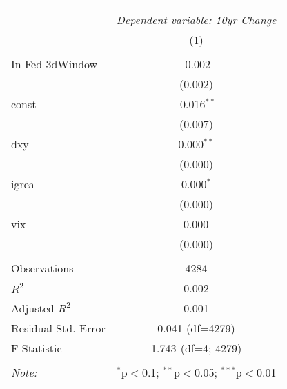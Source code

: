 \begin{table}[!htbp] \centering
\begin{tabular}{@{\extracolsep{5pt}}lc}
\\[-1.8ex]\hline
\hline \\[-1.8ex]
& \multicolumn{1}{c}{\textit{Dependent variable: 10yr Change}} \
\cr \cline{2-2}
\\[-1.8ex] & (1) \\
\hline \\[-1.8ex]
 In Fed 3dWindow & -0.002$^{}$ \\
& (0.002) \\
 const & -0.016$^{**}$ \\
& (0.007) \\
 dxy & 0.000$^{**}$ \\
& (0.000) \\
 igrea & 0.000$^{*}$ \\
& (0.000) \\
 vix & 0.000$^{}$ \\
& (0.000) \\
\hline \\[-1.8ex]
 Observations & 4284 \\
 $R^2$ & 0.002 \\
 Adjusted $R^2$ & 0.001 \\
 Residual Std. Error & 0.041 (df=4279) \\
 F Statistic & 1.743$^{}$ (df=4; 4279) \\
\hline
\hline \\[-1.8ex]
\textit{Note:} & \multicolumn{1}{r}{$^{*}$p$<$0.1; $^{**}$p$<$0.05; $^{***}$p$<$0.01} \\
\end{tabular}
\end{table}